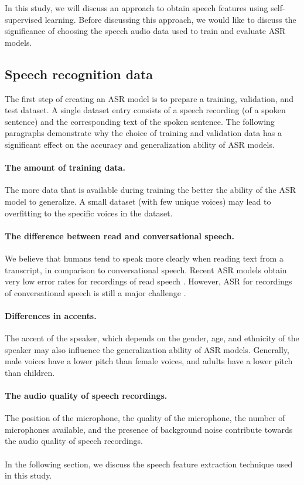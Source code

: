 In this study, we will discuss an approach to obtain speech features using self-supervised learning.
Before discussing this approach, we would like to discuss the significance of choosing the speech audio data 
used to train and evaluate ASR models.

\subsection{Speech recognition data}
The first step of creating an ASR model is to prepare a training, validation, and test dataset. 
A single dataset entry consists of a speech recording (of a spoken sentence) and the corresponding text of the spoken sentence.
The following paragraphs demonstrate why the choice of training and validation data 
has a significant effect on the accuracy and generalization ability of ASR models.

\paragraph*{The amount of training data.} The more data that is available during training the better the ability
of the ASR model to generalize. A small dataset (with few unique voices) may lead to overfitting to the specific 
voices in the dataset.

\paragraph*{The difference between read and conversational speech.} 
We believe that humans tend to speak more clearly when reading text from a transcript, in comparison to conversational speech.
Recent ASR models obtain very low error rates for recordings of read speech \cite{jurafskyspeech}.
However, ASR for recordings of conversational speech is still a major challenge \cite{jurafskyspeech}.

\paragraph*{Differences in accents.} 
The accent of the speaker, which depends on the gender, age, and ethnicity of the speaker may also influence the generalization ability of ASR models. 
Generally, male voices have a lower pitch than female voices, and adults have a lower pitch than children.

\paragraph*{The audio quality of speech recordings.} 
The position of the microphone, 
the quality of the microphone, 
the number of microphones available, 
and the presence of background noise contribute towards the audio quality of speech recordings.
\\
\\
In the following section, we discuss the speech feature extraction technique used in this study.

